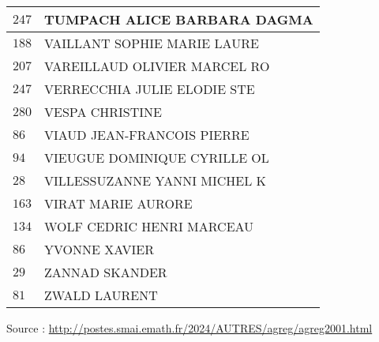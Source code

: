 \begin{xltabular}{\linewidth}{|l|X|}
    \hline
    $247$ & TUMPACH ALICE BARBARA DAGMA \\
    \hline
    $188$ & VAILLANT SOPHIE MARIE LAURE \\
    \hline
    $207$ & VAREILLAUD OLIVIER MARCEL RO \\
    \hline
    $247$ & VERRECCHIA JULIE ELODIE STE \\
    \hline
    $280$ & VESPA CHRISTINE \\
    \hline
    $86$ & VIAUD JEAN-FRANCOIS PIERRE \\
    \hline
    $94$ & VIEUGUE DOMINIQUE CYRILLE OL \\
    \hline
    $28$ & VILLESSUZANNE YANNI MICHEL K \\
    \hline
    $163$ & VIRAT MARIE AURORE \\
    \hline
    $134$ & WOLF CEDRIC HENRI MARCEAU \\
    \hline
    $86$ & YVONNE XAVIER \\
    \hline
    $29$ & ZANNAD SKANDER \\
    \hline
    $81$ & ZWALD LAURENT \\
    \hline
  \end{xltabular}

  \begin{flushright}
    {\tiny Source : \url{http://postes.smai.emath.fr/2024/AUTRES/agreg/agreg2001.html}}
  \end{flushright}

